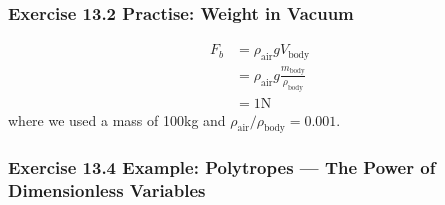 \documentclass[10pt,a4paper]{article}
\theoremstyle{definition}
\begin{document}
\subsubsection{Exercise 13.2 Practise: Weight in Vacuum}
\begin{align}
    F_{b}&=\rho_\text{air}gV_\text{body}\\
    &=\rho_\text{air}g\frac{m_\text{body}}{\rho_\text{body}}\\
    &=1\text{N}
\end{align}
where we used a mass of 100kg and $\rho_\text{air}/\rho_\text{body}=0.001$.

\subsubsection{Exercise 13.4 Example: Polytropes — The Power of Dimensionless Variables}
\end{document}
